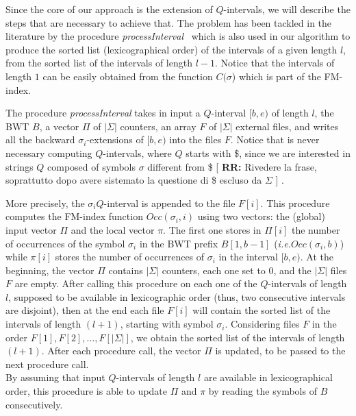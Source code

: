 \documentclass[runningheads,envcountsame,a4paper]{llncs}
\newcommand{\notaestesa}[2]{%
 \marginpar{\color{red!75!black}\textbf{\texttimes}}%
 {\color{red!75!black}%
 [\,\textbullet\,\textsf{\textbf{#1:}} %
 \textsf{\footnotesize#2}\,\textbullet\,]}%
}
\newcommand{\ie}{\textit{i.e.}\xspace}
\begin{document}
Since the core of our approach is the extension of $Q$-intervals, we will
describe the steps that are necessary to achieve that.
The problem has been tackled in the literature by
the procedure \emph{processInterval}~\cite{Cox2012} which is also used in our algorithm to produce the sorted list
(lexicographical order) of the intervals of a given length $l$, from the
sorted list of the intervals of length $l-1$. Notice that the intervals of length $1$
can be easily obtained from the  function $C(\sigma$) which is part of the FM-index.

The procedure \emph{processInterval} takes in input a $Q$-interval $[b,e)$ of
length $l$, the BWT $B$, a vector $\Pi$ of $|\Sigma|$ counters, an array $F$ of
$|\Sigma|$ external files, and writes all the backward $\sigma_i$-extensions of
$[b,e)$ into the files $F$. Notice that is never necessary computing $Q$-intervals, where $Q$ starts with \$, since we are interested in strings $Q$ composed of symbols $\sigma$ different from \$ \notaestesa{RR}{Rivedere la frase, soprattutto dopo avere sistemato la questione di \$ escluso da $\Sigma$}.

More precisely, the $\sigma_i Q$-interval is appended to the file $F[i]$.
This procedure computes the FM-index function $Occ(\sigma_i, i)$ using two
vectors: the (global) input vector $\Pi$ and the local vector $\pi$.
The first one stores in $\Pi[i]$ the number of occurrences of  the symbol
$\sigma_i$ in the BWT prefix $B[1,b-1]$ (\ie $Occ(\sigma_{i}, b)$) while $\pi[i]$ stores the number of occurrences of $\sigma_i$ in the interval $[b,e)$. At the beginning, the vector $\Pi$ contains $|\Sigma|$ counters, each one set to $0$, and the $|\Sigma|$ files $F$ are empty.
After calling this procedure on each one of the $Q$-intervals of length $l$, supposed to be available in lexicographic order (thus, two consecutive intervals are disjoint), then  at the end each file $F[i]$ will contain the sorted list of the intervals of length $(l+1)$, starting with symbol $\sigma_i$. Considering files $F$ in the order $F[1], F[2], \ldots ,F[|\Sigma|]$, we obtain the sorted list of the intervals of length $(l+1)$. After each procedure call, the vector $\Pi$ is updated, to be passed to the next procedure call.\\
By assuming that input $Q$-intervals of length $l$ are available in lexicographical order, this procedure is able to update $\Pi$ and $\pi$ by reading the symbols of $B$ consecutively.
\end{document}
